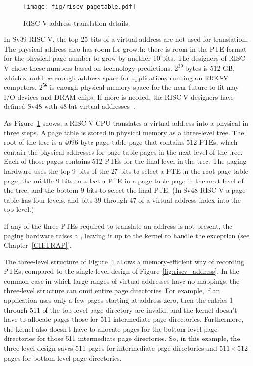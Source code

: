 \begin{figure}[t]
\center
\texttt{[image: fig/riscv\_pagetable.pdf]}
\caption{RISC-V address translation details.}
\label{fig:riscv_pagetable}
\end{figure}

In Sv39 RISC-V, the top 25 bits of a virtual address are not used for
translation. The physical address also has room for growth: there is
room in the PTE format for the physical page number to grow by another
10 bits.  The designers of RISC-V chose these numbers based on
technology predictions.  $2^{39}$ bytes is 512 GB, which should be
enough address space for applications running on RISC-V
computers. $2^{56}$ is enough physical memory space for the near
future to fit may I/O devices and DRAM chips. If
more is needed, the RISC-V designers have defined Sv48 with 48-bit
virtual addresses~\cite{riscv:priv}.

As 
Figure~\ref{fig:riscv_pagetable} shows,
a RISC-V CPU translates a virtual address into a physical in
three steps.  A page table is stored
in physical memory as a three-level tree.
The root of the tree is a
4096-byte page-table page that contains 512 PTEs, which contain the physical
addresses for page-table pages in the next level of the tree.  Each of those
pages contains 512 PTEs for the final level in the tree.  The paging
hardware uses the top 9 bits of the 27 bits to select a PTE in the
root page-table page, the middle 9 bits to select a PTE in a page-table page in the
next level of the
tree, and the bottom 9 bits to select the final PTE.
(In Sv48 RISC-V a page table has four levels, and bits 39 through 47
of a virtual address index into the top-level.)

If any of the three PTEs required to translate an address
is not present, the paging hardware raises a , leaving it up
to the kernel to handle the exception (see Chapter~\ref{CH:TRAP}).

The three-level structure of Figure~\ref{fig:riscv_pagetable} allows a
memory-efficient way of recording PTEs, compared to the single-level
design of Figure~\ref{fig:riscv_address}.  In the common case in which
large ranges of virtual addresses have no mappings, the three-level
structure can omit entire page directories.  For example, if an
application uses only a few pages starting at address zero, then the
entries 1 through 511 of the top-level page directory are invalid, and
the kernel doesn't have to allocate pages those for 511 intermediate
page directories.  Furthermore, the kernel also doesn't have to
allocate pages for the bottom-level page directories for those 511
intermediate page directories. So, in this example, the three-level
design saves 511 pages for intermediate page directories and
$511\times512$ pages for bottom-level page directories.

